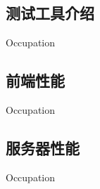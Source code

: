 
\subsection{测试工具介绍}
\indent
Occupation

\subsection{前端性能}
\indent
Occupation

\subsection{服务器性能}
\indent
Occupation